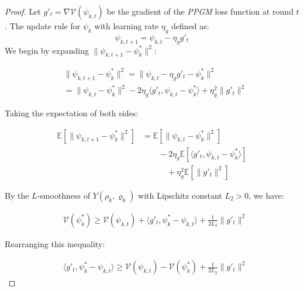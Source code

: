 \documentclass[lettersize,journal]{IEEEtran}
\newtheorem{proof}{Proof}
\begin{document}
\begin{proof}
Let $g'_t = \nabla \mathcal{V}(\psi_{k,t})$ be the gradient of the \emph{PPGM} loss function at round $t$. The update rule for $\psi_k$ with learning rate $\eta_g$ defined as:
\begin{equation}
\psi_{k,t+1} = \psi_{k,t} - \eta_g g'_t
\end{equation}
We begin by expanding $\|\psi_{k,t+1} - \psi_k^*\|^2$:

\begin{align*}
&\|\psi_{k,t+1} - \psi_k^*\|^2 = \|\psi_{k,t} - \eta_g g'_t - \psi_k^*\|^2 \\
&= \|\psi_{k,t} - \psi_k^*\|^2 - 2\eta_g \langle g'_t, \psi_{k,t} - \psi_k^* \rangle + \eta_g^2 \|g'_t\|^2
\end{align*}

Taking the expectation of both sides:

\begin{equation}
\label{eq:21}
\begin{split}
\mathbb{E}[\|\psi_{k,t+1} - \psi_k^*\|^2] &= \mathbb{E}[\|\psi_{k,t} - \psi_k^*\|^2] \\
&\qquad- 2\eta_g \mathbb{E}[\langle g'_t, \psi_{k,t} - \psi_k^* \rangle]\\ 
&\qquad \quad+ \eta_g^2 \mathbb{E}[\|g'_t\|^2]
\end{split}
\end{equation}

By the $L$-smoothness of $Y(\rho_k,\varrho_k)$ with Lipschitz constant $L_2 > 0$, we have:

\begin{equation}
\begin{split}
&\mathcal{V}(\psi_k^*) \geq \mathcal{V}(\psi_{k,t}) + \langle g'_t, \psi_k^* - \psi_{k,t} \rangle + \frac{1}{2L_2}\|g'_t\|^2    
\end{split}
\end{equation}

Rearranging this inequality:

\begin{equation}
\label{eq:23}
\begin{split}
&\langle g'_t, \psi_k^* - \psi_{k,t} \rangle \geq \mathcal{V}(\psi_{k,t})- \mathcal{V}(\psi_k^*) + \frac{1}{2L_2}\|g'_t\|^2
\end{split}
\end{equation}


\end{proof}
\end{document}
